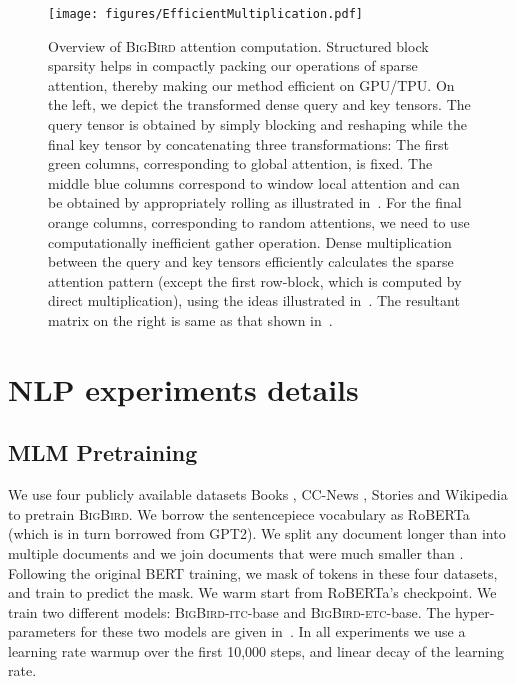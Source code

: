 \documentclass{article}
\newcommand{\bigb}{\textsc{BigBird}\xspace}
\begin{document}
\begin{figure}[hbt]
    \centering
    \texttt{[image: figures/EfficientMultiplication.pdf]}
    \caption{Overview of \bigb attention computation. Structured block sparsity helps in compactly packing our operations of sparse attention, thereby making our method efficient on GPU/TPU.
    On the left, we depict the transformed dense query and key tensors.
    The query tensor is obtained by simply blocking and reshaping while the final key tensor by concatenating three transformations: 
    The first green columns, corresponding to global attention, is fixed. 
    The middle blue columns correspond to window local attention and can be obtained by appropriately rolling as illustrated in~.
    For the final orange columns, corresponding to random attentions, we need to use computationally inefficient gather operation.
    Dense multiplication between the query and key tensors efficiently calculates the sparse attention pattern (except the first row-block, which is computed by direct multiplication), using the ideas illustrated in~.
    The resultant matrix on the right is same as that shown in~. 
    }
    \label{fig:apndx_blk_cmp}
    \vspace{-3mm}
\end{figure} 
\newpage
\section{NLP experiments details}
\label{sec:apndx-expt-nlp}

\subsection{MLM Pretraining}
\label{sec:app-expt-nlp:mlm}

We use four publicly available datasets Books \citep{zhu2015aligning}, CC-News \citep{guu2020realm}, Stories \citep{trinh2018simple} and Wikipedia to pretrain \bigb. 
We borrow the sentencepiece vocabulary as RoBERTa (which is in turn borrowed from GPT2).
We split any document longer than  into multiple documents and we join documents that were much smaller than .
Following the original BERT training, we mask  of tokens in these four datasets, and train to predict the mask. We warm start from RoBERTa's checkpoint. 
We train two different models: \bigb-\textsc{itc}-base and \bigb-\textsc{etc}-base. The hyper-parameters for these two models are given in~. In all experiments we use a learning
rate warmup over the first 10,000 steps, and linear
decay of the learning rate. 
\end{document}
